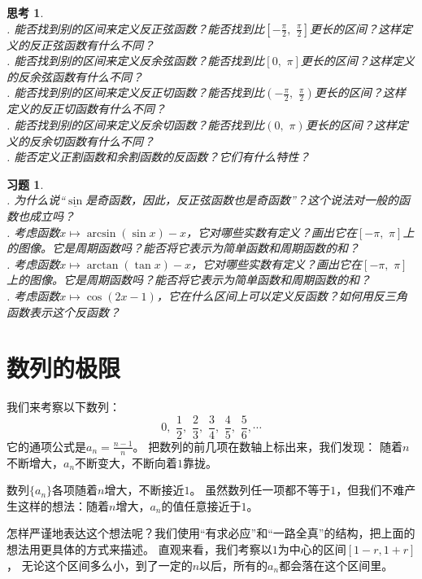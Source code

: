 \documentclass[12pt,UTF8]{ctexbook}
\newtheorem{sk}{思考}[section]
\newtheorem{xt}{习题}[section]
\begin{document}
\begin{sk}
    \mbox{} \\
    . 能否找到别的区间来定义反正弦函数？能否找到比$[-\frac{\pi}{2}, \,\, \frac{\pi}{2}]$更长的区间？这样定义的反正弦函数有什么不同？\\
    . 能否找到别的区间来定义反余弦函数？能否找到比$[0, \,\, \pi]$更长的区间？这样定义的反余弦函数有什么不同？\\
    . 能否找到别的区间来定义反正切函数？能否找到比$(-\frac{\pi}{2}, \,\, \frac{\pi}{2})$更长的区间？这样定义的反正切函数有什么不同？\\
    . 能否找到别的区间来定义反余切函数？能否找到比$(0, \,\, \pi)$更长的区间？这样定义的反余切函数有什么不同？\\
    . 能否定义正割函数和余割函数的反函数？它们有什么特性？
\end{sk}
\begin{xt}
    \mbox{} \\
    . 为什么说“$\underline{\sin}$是奇函数，因此，反正弦函数也是奇函数”？这个说法对一般的函数也成立吗？\\
    . 考虑函数$x\mapsto \arcsin{(\sin{x})} - x$，它对哪些实数有定义？画出它在$[-\pi, \,\, \pi]$上的图像。它是周期函数吗？能否将它表示为简单函数和周期函数的和？\\
    . 考虑函数$x\mapsto \arctan{(\tan{x})} - x$，它对哪些实数有定义？画出它在$[-\pi, \,\, \pi]$上的图像。它是周期函数吗？能否将它表示为简单函数和周期函数的和？\\
    . 考虑函数$x\mapsto \cos(2x - 1)$，它在什么区间上可以定义反函数？如何用反三角函数表示这个反函数？
\end{xt}


\chapter{数列的极限}

我们来考察以下数列：
$$ 0,\,\, \frac{1}{2}, \,\,\frac{2}{3},\,\, \frac{3}{4}, \,\,\frac{4}{5}, \,\,\frac{5}{6}, \cdots $$
它的通项公式是$a_n = \frac{n-1}{n}$。
把数列的前几项在数轴上标出来，我们发现：
随着$n$不断增大，$a_n$不断变大，不断向着$1$靠拢。

数列$\{a_n\}$各项随着$n$增大，不断接近$1$。
虽然数列任一项都不等于$1$，但我们不难产生这样的想法：随着$n$增大，$a_n$的值任意接近于$1$。

怎样严谨地表达这个想法呢？我们使用“有求必应”和“一路全真”的结构，把上面的想法用更具体的方式来描述。
直观来看，我们考察以$1$为中心的区间$[1-r,1+r]$，
无论这个区间多么小，到了一定的$n$以后，所有的$a_n$都会落在这个区间里。
\end{document}
